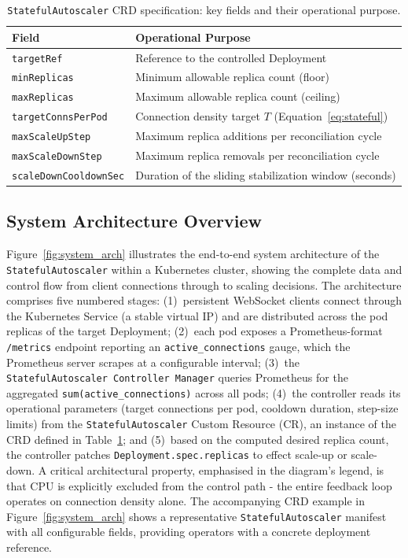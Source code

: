 \documentclass[twocolumn]{svjour3}
\begin{document}
\begin{table}[ht]
\centering
\caption{\texttt{StatefulAutoscaler} CRD specification: key fields and their operational purpose.}
\label{tab:crd}
\begin{tabular}{@{}lp{4.6cm}@{}}
\toprule
\rowcolor{gray!12}
\textbf{Field} & \textbf{Operational Purpose} \\
\midrule
\texttt{targetRef} & Reference to the controlled Deployment \\
\texttt{minReplicas} & Minimum allowable replica count (floor) \\
\texttt{maxReplicas} & Maximum allowable replica count (ceiling) \\
\texttt{targetConnsPerPod} & Connection density target $T$ (Equation~\ref{eq:stateful}) \\
\texttt{maxScaleUpStep} & Maximum replica additions per reconciliation cycle \\
\texttt{maxScaleDownStep} & Maximum replica removals per reconciliation cycle \\
\texttt{scaleDownCooldownSec} & Duration of the sliding stabilization window (seconds) \\
\bottomrule
\end{tabular}
\end{table}

\subsection{System Architecture Overview}

Figure~\ref{fig:system_arch} illustrates the end-to-end system architecture of the \texttt{StatefulAutoscaler} within a Kubernetes cluster, showing the complete data and control flow from client connections through to scaling decisions. The architecture comprises five numbered stages: (1)~persistent WebSocket clients connect through the Kubernetes Service (a stable virtual IP) and are distributed across the pod replicas of the target Deployment; (2)~each pod exposes a Prometheus-format \texttt{/metrics} endpoint reporting an \texttt{active\_connections} gauge, which the Prometheus server scrapes at a configurable interval; (3)~the \texttt{StatefulAutoscaler Controller Manager} queries Prometheus for the aggregated \texttt{sum(active\_connections)} across all pods; (4)~the controller reads its operational parameters (target connections per pod, cooldown duration, step-size limits) from the \texttt{StatefulAutoscaler} Custom Resource (CR), an instance of the CRD defined in Table~\ref{tab:crd}; and (5)~based on the computed desired replica count, the controller patches \texttt{Deployment.spec.replicas} to effect scale-up or scale-down. A critical architectural property, emphasised in the diagram's legend, is that CPU is explicitly excluded from the control path - the entire feedback loop operates on connection density alone. The accompanying CRD example in Figure~\ref{fig:system_arch} shows a representative \texttt{StatefulAutoscaler} manifest with all configurable fields, providing operators with a concrete deployment reference.
\end{document}
